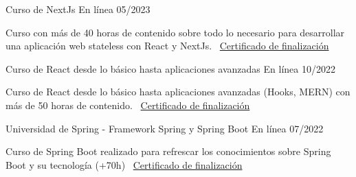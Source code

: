 \documentclass[]{awesome-cv}
\begin{document}
\vspace{4mm}
\begin{cventries}
	\vspace{2mm}
	\cventry
	{}
	{Curso de NextJs \vspace{-4mm}}
	{En línea \vspace{-5mm}}
	{05/2023 \vspace{-5mm}}
	{\begin{cvsectionnormaltext} 
		\item{Curso con más de 40 horas de contenido sobre todo lo necesario para desarrollar una aplicación web stateless con React y NextJs.
		\newline \vspace{2mm} \faLink\ \href{https://www.udemy.com/certificate/UC-1ede8757-aa0d-406f-813a-8eaa400532c5/}{Certificado de finalización}}
	\end{cvsectionnormaltext}}
    {}

	\cventry
	{}
	{Curso de React desde lo básico hasta aplicaciones avanzadas \vspace{-4mm}}
	{En línea \vspace{-5mm}}
	{10/2022 \vspace{-5mm}}
	{\begin{cvsectionnormaltext} 
		\item{Curso de React desde lo básico hasta aplicaciones avanzadas (Hooks, MERN) con más de 50 horas de contenido.
		\newline \vspace{2mm} \faLink\ \href{https://www.udemy.com/certificate/UC-fcb467ab-c089-419c-9b6a-afe97f894d14/}{Certificado de finalización}}
	\end{cvsectionnormaltext}}
    {}

	\cventry
	{}
	{Universidad de Spring - Framework Spring y Spring Boot \vspace{-4mm}}
	{En línea \vspace{-5mm}}
	{07/2022 \vspace{-5mm}}
	{\begin{cvsectionnormaltext} 
		\item{Curso de Spring Boot realizado para refrescar los conocimientos sobre Spring Boot y su tecnología (+70h)
		\newline \vspace{2mm} \faLink\ \href{https://www.udemy.com/certificate/UC-ee0ce349-6915-479b-b038-5253aba9d0d8/}{Certificado de finalización}}
	\end{cvsectionnormaltext}}
    {}


\end{cventries}
\end{document}
